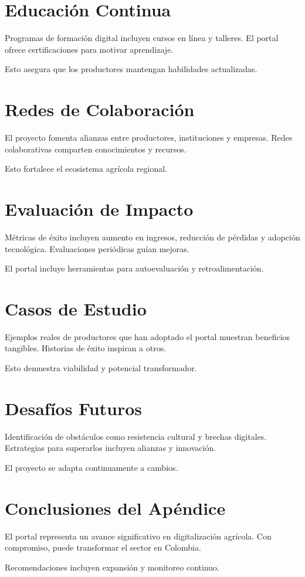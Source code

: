 \section{Educación Continua}

Programas de formación digital incluyen cursos en línea y talleres. El portal ofrece certificaciones para motivar aprendizaje.

Esto asegura que los productores mantengan habilidades actualizadas.

\section{Redes de Colaboración}

El proyecto fomenta alianzas entre productores, instituciones y empresas. Redes colaborativas comparten conocimientos y recursos.

Esto fortalece el ecosistema agrícola regional.

\section{Evaluación de Impacto}

Métricas de éxito incluyen aumento en ingresos, reducción de pérdidas y adopción tecnológica. Evaluaciones periódicas guían mejoras.

El portal incluye herramientas para autoevaluación y retroalimentación.

\section{Casos de Estudio}

Ejemplos reales de productores que han adoptado el portal muestran beneficios tangibles. Historias de éxito inspiran a otros.

Esto demuestra viabilidad y potencial transformador.

\section{Desafíos Futuros}

Identificación de obstáculos como resistencia cultural y brechas digitales. Estrategias para superarlos incluyen alianzas y innovación.

El proyecto se adapta continuamente a cambios.

\section{Conclusiones del Apéndice}

El portal representa un avance significativo en digitalización agrícola. Con compromiso, puede transformar el sector en Colombia.

Recomendaciones incluyen expansión y monitoreo continuo.
